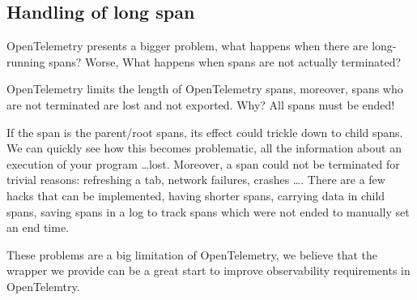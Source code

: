     \subsection{Handling of long span}
        OpenTelemetry presents a bigger problem, what happens when there are long-running spans? Worse, What happens when spans are not actually terminated?

        OpenTelemetry limits the length of OpenTelemetry spans, moreover, spans who are not terminated are lost and not exported. Why? All spans must be ended!

        If the span is the parent/root spans, its effect could trickle down to child spans. We can quickly see how this becomes problematic, all the information about an execution of your program \dots lost. Moreover, a span could not be terminated for trivial reasons: refreshing a tab, network failures, crashes \dots \cite{otel-l}. There are a few hacks that can be implemented, having shorter spans, carrying data in child spans, saving spans in a log to track spans which were not ended to manually set an end time.

        These problems are a big limitation of OpenTelemetry, we believe that the wrapper we provide can be a great start to improve observability requirements in OpenTelemtry.
